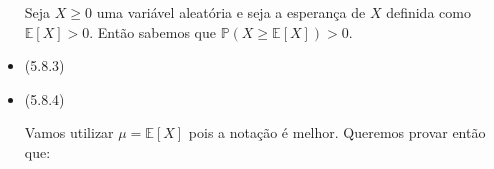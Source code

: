\documentclass{article}
\begin{document}
\begin{itemize}
	      Seja \(X \geq 0\) uma variável aleatória e seja a esperança de \(X\) definida como \(\mathbb{E}[X] > 0\). Então sabemos que \(\mathbb{P}(X \geq \mathbb{E}[X]) > 0\).



	\item (5.8.3)



	\item (5.8.4)

	      Vamos utilizar \(\mu = \mathbb{E}[X]\) pois a notação é melhor. Queremos provar então que:


\end{itemize}
\end{document}
